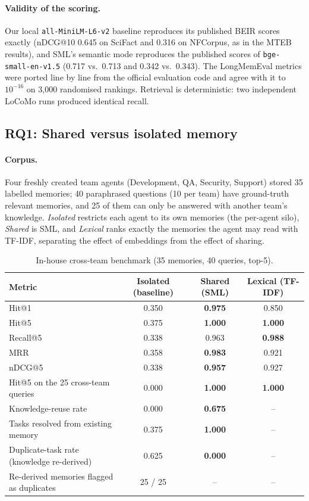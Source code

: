 \documentclass[11pt,a4paper]{article}
\newcommand{\sys}{SML}
\newcommand{\best}[1]{\textbf{#1}}
\begin{document}
\paragraph{Validity of the scoring.} Our local \texttt{all-MiniLM-L6-v2} baseline reproduces its published
BEIR scores exactly (nDCG@10 0.645 on SciFact and 0.316 on NFCorpus, as in the MTEB results), and \sys{}'s
semantic mode reproduces the published scores of \texttt{bge-small-en-v1.5} (0.717 vs.\ 0.713 and 0.342 vs.\
0.343). The LongMemEval metrics were ported line by line from the official evaluation code and agree with it
to $10^{-16}$ on 3{,}000 randomised rankings. Retrieval is deterministic: two independent LoCoMo runs
produced identical recall.

\subsection{RQ1: Shared versus isolated memory}

\paragraph{Corpus.} Four freshly created team agents (Development, QA, Security, Support) stored 35 labelled
memories; 40 paraphrased questions (10 per team) have ground-truth relevant memories, and 25 of them can only
be answered with another team's knowledge. \emph{Isolated} restricts each agent to its own memories (the
per-agent silo), \emph{Shared} is \sys{}, and \emph{Lexical} ranks exactly the memories the agent may read
with TF-IDF, separating the effect of embeddings from the effect of sharing.

\begin{table}[htbp]
\centering
\small
\caption{In-house cross-team benchmark (35 memories, 40 queries, top-5).}
\label{tab:inhouse}
\begin{tabular}{@{}lccc@{}}
\toprule
Metric & Isolated (baseline) & \textbf{Shared (\sys{})} & Lexical (TF-IDF) \\
\midrule
Hit@1 & 0.350 & \best{0.975} & 0.850 \\
Hit@5 & 0.375 & \best{1.000} & \best{1.000} \\
Recall@5 & 0.338 & 0.963 & \best{0.988} \\
MRR & 0.358 & \best{0.983} & 0.921 \\
nDCG@5 & 0.338 & \best{0.957} & 0.927 \\
Hit@5 on the 25 cross-team queries & 0.000 & \best{1.000} & \best{1.000} \\
Knowledge-reuse rate & 0.000 & \best{0.675} & -- \\
\midrule
Tasks resolved from existing memory & 0.375 & \best{1.000} & -- \\
Duplicate-task rate (knowledge re-derived) & 0.625 & \best{0.000} & -- \\
Re-derived memories flagged as duplicates & 25 / 25 & -- & -- \\
\bottomrule
\end{tabular}
\end{table}
\end{document}
